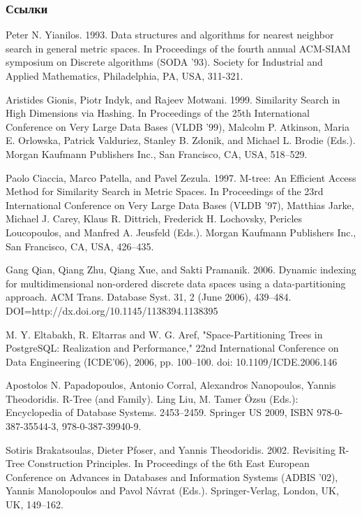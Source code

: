 \documentclass{beamer}
\begin{document}
\begin{frame}[allowframebreaks]
\frametitle{Ссылки}
\footnotesize{
\begin{thebibliography}{99}
	
 Peter N. Yianilos. 1993. Data structures and algorithms for nearest neighbor search in general metric spaces. In Proceedings of the fourth annual ACM-SIAM symposium on Discrete algorithms (SODA '93). Society for Industrial and Applied Mathematics, Philadelphia, PA, USA, 311-321. 

 Aristides Gionis, Piotr Indyk, and Rajeev Motwani. 1999. Similarity Search in High Dimensions via Hashing. In Proceedings of the 25th International Conference on Very Large Data Bases (VLDB '99), Malcolm P. Atkinson, Maria E. Orlowska, Patrick Valduriez, Stanley B. Zdonik, and Michael L. Brodie (Eds.). Morgan Kaufmann Publishers Inc., San Francisco, CA, USA, 518--529. 

 Paolo Ciaccia, Marco Patella, and Pavel Zezula. 1997. M-tree: An Efficient Access Method for Similarity Search in Metric Spaces. In Proceedings of the 23rd International Conference on Very Large Data Bases (VLDB '97), Matthias Jarke, Michael J. Carey, Klaus R. Dittrich, Frederick H. Lochovsky, Pericles Loucopoulos, and Manfred A. Jeusfeld (Eds.). Morgan Kaufmann Publishers Inc., San Francisco, CA, USA, 426--435. 

 Gang Qian, Qiang Zhu, Qiang Xue, and Sakti Pramanik. 2006. Dynamic indexing for multidimensional non-ordered discrete data spaces using a data-partitioning approach. ACM Trans. Database Syst. 31, 2 (June 2006), 439--484. DOI=http://dx.doi.org/10.1145/1138394.1138395 

 M. Y. Eltabakh, R. Eltarras and W. G. Aref, "Space-Partitioning Trees in PostgreSQL: Realization and Performance," 22nd International Conference on Data Engineering (ICDE'06), 2006, pp. 100--100. doi: 10.1109/ICDE.2006.146

 Apostolos N. Papadopoulos, Antonio Corral, Alexandros Nanopoulos, Yannis Theodoridis. R-Tree (and Family). Ling Liu, M. Tamer Özsu (Eds.): Encyclopedia of Database Systems. 2453--2459. Springer US 2009, ISBN 978-0-387-35544-3, 978-0-387-39940-9.

 Sotiris Brakatsoulas, Dieter Pfoser, and Yannis Theodoridis. 2002. Revisiting R-Tree Construction Principles. In Proceedings of the 6th East European Conference on Advances in Databases and Information Systems (ADBIS '02), Yannis Manolopoulos and Pavol Návrat (Eds.). Springer-Verlag, London, UK, UK, 149--162. 


\end{thebibliography}}
\end{frame}
\end{document}

